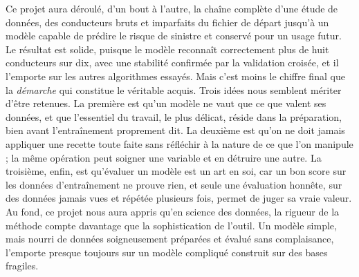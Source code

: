 \documentclass[12pt,oneside,noprintercorrection]{iut}
\begin{document}

Ce projet aura déroulé, d'un bout à l'autre, la chaîne complète d'une étude de données,
des conducteurs bruts et imparfaits du fichier de départ jusqu'à un modèle capable de
prédire le risque de sinistre et conservé pour un usage futur. Le résultat est solide,
puisque le modèle reconnaît correctement plus de huit conducteurs sur dix, avec une stabilité
confirmée par la validation croisée, et il l'emporte sur les autres algorithmes essayés.
\newline
\newline
Mais c'est moins le chiffre final que la \emph{démarche} qui constitue le véritable
acquis. Trois idées nous semblent mériter d'être retenues. La première est qu'un modèle ne
vaut que ce que valent ses données, et que l'essentiel du travail, le plus délicat, réside
dans la préparation, bien avant l'entraînement proprement dit. La deuxième est qu'on ne
doit jamais appliquer une recette toute faite sans réfléchir à la nature de ce que l'on
manipule ; la même opération peut soigner une variable et en détruire une autre. La
troisième, enfin, est qu'évaluer un modèle est un art en soi, car un bon score sur les
données d'entraînement ne prouve rien, et seule une évaluation honnête, sur des données
jamais vues et répétée plusieurs fois, permet de juger sa vraie valeur.
\newline
\newline
Au fond, ce projet nous aura appris qu'en science des données, la rigueur de la méthode
compte davantage que la sophistication de l'outil. Un modèle simple, mais nourri de
données soigneusement préparées et évalué sans complaisance, l'emporte presque toujours
sur un modèle compliqué construit sur des bases fragiles.
\end{document}
